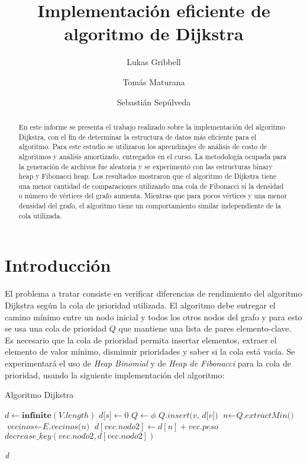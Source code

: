 \documentclass[11pt]{article}
\title{Implementación eficiente de algoritmo de Dijkstra}
\author{Lukas Gribbell \and Tomás Maturana \and Sebastián Sepúlveda}
\begin{document}
\maketitle

\begin{abstract}
	En este informe se presenta el trabajo realizado sobre la implementación del algoritmo Dijkstra, con el fin de determinar la estructura de datos más eficiente para el algoritmo. Para este estudio se utilizaron los aprendizajes de análisis de costo de algoritmos y análisis amortizado, entregados en el curso. La metodología ocupada para la generación de archivos fue aleatoria y se experimentó con las estructuras binary heap y Fibonacci heap. Los resultados mostraron que el algoritmo de Dijkstra tiene una menor cantidad de comparaciones utilizando una cola de Fibonacci si la densidad o número de vértices del grafo aumenta. Mientras que para pocos vértices y una menor densidad del grafo, el algoritmo tiene un comportamiento similar independiente de la cola utilizada. 
\end{abstract}



\section{Introducción}
El problema a tratar consiste en verificar diferencias de rendimiento del algoritmo Dijkstra según la cola de prioridad utilizada. El algoritmo debe entregar el camino mínimo entre un nodo inicial y todos los otros nodos del grafo y para esto se usa una cola de prioridad $Q$ que mantiene una lista de pares elemento-clave. Es necesario que la cola de prioridad permita insertar elementos, extraer el elemento de valor mínimo, disminuir prioridades y saber si la cola está vacía. Se experimentará el uso de \textit{Heap Binomial} y de \textit{Heap de Fibonacci} para la cola de prioridad, usando la siguiente implementación del algoritmo: \\

\begin{algorithm}
\caption{Algoritmo Dijkstra}
\label{alg:Dijkstra}
\begin{algorithmic}[1]
\State $\textit{d} \gets \textbf{infinite}(V.length)$
\State $\textit{d[s]} \gets 0$
\State $\textit{Q} \gets \phi $
    \State $\textit{Q.insert(v, d[v])} $
\EndFor
{}
    \State $\textit{n} \gets \textit{Q.extractMin()} $
    \State $\textit{vecinos} \gets \textit{E.vecinos(n)} $
            \State $d[vec.nodo2] \gets d[n] + vec.peso$
            \State $decrease\_key(vec.nodo2, d[vec.nodo2])$
        \EndIf
    \EndFor
\EndWhile

\State \Return \textit{d}
\EndProcedure
\end{algorithmic}
\end{algorithm}
\end{document}
